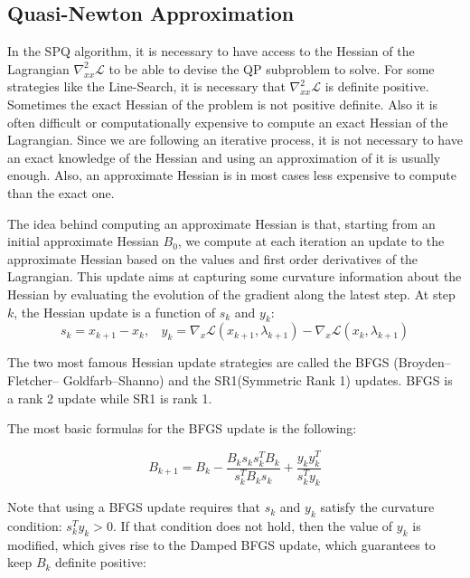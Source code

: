 \subsection{Quasi-Newton Approximation}
\label{sub:quasi_newton_approximation}

In the SPQ algorithm, it is necessary to have access to the Hessian of the Lagrangian $\nabla_{xx}^2\mathcal{L}$ to be able to devise the QP subproblem to solve.
For some strategies like the Line-Search, it is necessary that $\nabla_{xx}^2\mathcal{L}$ is definite positive.
Sometimes the exact Hessian of the problem is not positive definite.
Also it is often difficult or computationally expensive to compute an exact Hessian of the Lagrangian.
Since we are following an iterative process, it is not necessary to have an exact knowledge of the Hessian and using an approximation of it is usually enough.
Also, an approximate Hessian is in most cases less expensive to compute than the exact one.

The idea behind computing an approximate Hessian is that, starting from an initial approximate Hessian $B_0$, we compute at each iteration an update to the approximate Hessian based on the values and first order derivatives of the Lagrangian.
This update aims at capturing some curvature information about the Hessian by evaluating the evolution of the gradient along the latest step.
At step $k$, the Hessian update is a function of $s_k$ and $y_k$:
\begin{equation}
  s_k = x_{k+1}-x_k,\ \ \ \
  y_k = \nabla_x\mathcal{L}(x_{k+1}, \lambda_{k+1}) - \nabla_x\mathcal{L}(x_{k}, \lambda_{k+1})
\end{equation}

The two most famous Hessian update strategies are called the BFGS (Broyden–Fletcher– Goldfarb–Shanno) and the SR1(Symmetric Rank 1) updates.
BFGS is a rank 2 update while SR1 is rank 1.

The most basic formulas for the BFGS update is the following:

\begin{equation}
  \label{BFGS}
  B_{k+1} = B_k - \frac{B_k s_k s_k^T B_k}{s_k^T B_k s_k} + \frac{y_k y_k^T}{s_k^T y_k}
\end{equation}

Note that using a BFGS update requires that $s_k$ and $y_k$ satisfy the curvature condition: $s_k^Ty_k>0$.
If that condition does not hold, then the value of $y_k$ is modified, which gives rise to the Damped BFGS update, which guarantees to keep $B_k$ definite positive:

